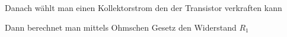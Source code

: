 \begin{frame}
\begin{columns}
\begin{itemize}
{      \item Danach wählt man einen Kollektorstrom den der Transistor verkraften kann
      \item Dann berechnet man mittels Ohmschen Gesetz den Widerstand $R_1$
        }
    \end{itemize}
  \end{columns}
\end{frame}

